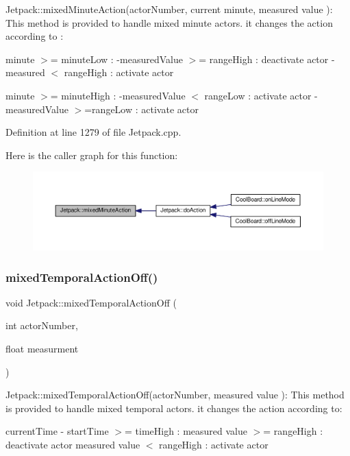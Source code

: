 Jetpack\+::mixed\+Minute\+Action(actor\+Number, current minute, measured value )\+: This method is provided to handle mixed minute actors. it changes the action according to \+:

minute $>$= minute\+Low \+: -\/measured\+Value $>$= range\+High \+: deactivate actor -\/measured $<$ range\+High \+: activate actor

minute $>$= minute\+High \+: -\/measured\+Value $<$ range\+Low \+: activate actor -\/measured\+Value $>$=range\+Low \+: activate actor 

Definition at line 1279 of file Jetpack.\+cpp.

Here is the caller graph for this function\+:\nopagebreak
\begin{figure}[H]
\begin{center}
\leavevmode
\includegraphics[width=350pt]{class_jetpack_acf8ed1fb594b9e8e224f4ed872a8e093_icgraph}
\end{center}
\end{figure}
\mbox{\label{class_jetpack_af2f567ef6311a8fc2f7bb948837667b7}} 
\subsubsection{\texorpdfstring{mixed\+Temporal\+Action\+Off()}{mixedTemporalActionOff()}}
{\footnotesize\ttfamily void Jetpack\+::mixed\+Temporal\+Action\+Off (\begin{DoxyParamCaption}\item[{int}]{actor\+Number,  }\item[{float}]{measurment }\end{DoxyParamCaption})}

Jetpack\+::mixed\+Temporal\+Action\+Off(actor\+Number, measured value )\+: This method is provided to handle mixed temporal actors. it changes the action according to\+:

current\+Time -\/ start\+Time $>$= time\+High \+: measured value $>$= range\+High \+: deactivate actor measured value $<$ range\+High \+: activate actor 

